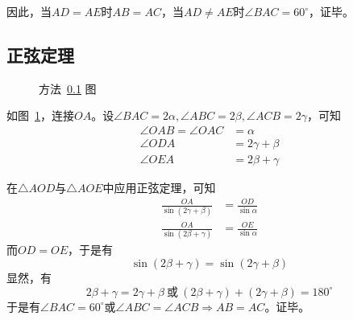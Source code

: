 因此，当$AD = AE$时$AB = AC$，当$AD \ne AE$时$\angle BAC = 60^\circ$，证毕。

\subsection{正弦定理} \label{subsec:0093-sin}

\begin{figure}[htbp]
  \centering {}
  \caption{方法~\ref{subsec:0093-sin} 图} \label{fig:0093-sin}
\end{figure}

如图~\ref{fig:0093-sin}，连接$OA$。设$\angle BAC = 2\alpha, \angle ABC = 2\beta, \angle ACB = 2\gamma$，可知
\begin{align*}
  \angle OAB = \angle OAC &= \alpha \\
  \angle ODA &= 2\gamma + \beta \\
  \angle OEA &= 2\beta + \gamma
\end{align*}

在$\triangle AOD$与$\triangle AOE$中应用正弦定理，可知
\begin{align*}
  \frac{OA}{\sin(2\gamma + \beta)} &= \frac{OD}{\sin\alpha} \\
  \frac{OA}{\sin(2\beta + \gamma)} &= \frac{OE}{\sin\alpha}
\end{align*}
而$OD = OE$，于是有
\[ \sin(2\beta + \gamma) = \sin(2\gamma + \beta) \]
显然，有
\[ 2\beta + \gamma = 2\gamma + \beta\ \text{或}\ (2\beta + \gamma) + (2\gamma + \beta) = 180^\circ \]
于是有$\angle BAC = 60^\circ$或$\angle ABC = \angle ACB \Rightarrow AB = AC$。证毕。
